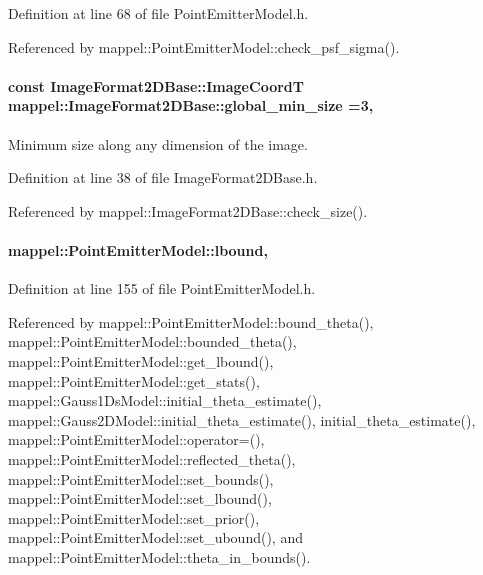 Definition at line 68 of file Point\+Emitter\+Model.\+h.



Referenced by mappel\+::\+Point\+Emitter\+Model\+::check\+\_\+psf\+\_\+sigma().

\paragraph[{\texorpdfstring{global\+\_\+min\+\_\+size}{global_min_size}}]{\setlength{\rightskip}{0pt plus 5cm}const {\bf Image\+Format2\+D\+Base\+::\+Image\+CoordT} mappel\+::\+Image\+Format2\+D\+Base\+::global\+\_\+min\+\_\+size =3\hspace{0.3cm}{\ttfamily [static]}, {\ttfamily [inherited]}}\hypertarget{classmappel_1_1ImageFormat2DBase_a1149e8545d3cfaa40c2f3bc02e3223b2}{}\label{classmappel_1_1ImageFormat2DBase_a1149e8545d3cfaa40c2f3bc02e3223b2}
Minimum size along any dimension of the image. 

Definition at line 38 of file Image\+Format2\+D\+Base.\+h.



Referenced by mappel\+::\+Image\+Format2\+D\+Base\+::check\+\_\+size().

\paragraph[{\texorpdfstring{lbound}{lbound}}]{ mappel\+::\+Point\+Emitter\+Model\+::lbound\hspace{0.3cm}{\ttfamily [protected]}, {\ttfamily [inherited]}}\hypertarget{classmappel_1_1PointEmitterModel_a889bc82f74cfa654da121e5770296ab2}{}\label{classmappel_1_1PointEmitterModel_a889bc82f74cfa654da121e5770296ab2}


Definition at line 155 of file Point\+Emitter\+Model.\+h.



Referenced by mappel\+::\+Point\+Emitter\+Model\+::bound\+\_\+theta(), mappel\+::\+Point\+Emitter\+Model\+::bounded\+\_\+theta(), mappel\+::\+Point\+Emitter\+Model\+::get\+\_\+lbound(), mappel\+::\+Point\+Emitter\+Model\+::get\+\_\+stats(), mappel\+::\+Gauss1\+Ds\+Model\+::initial\+\_\+theta\+\_\+estimate(), mappel\+::\+Gauss2\+D\+Model\+::initial\+\_\+theta\+\_\+estimate(), initial\+\_\+theta\+\_\+estimate(), mappel\+::\+Point\+Emitter\+Model\+::operator=(), mappel\+::\+Point\+Emitter\+Model\+::reflected\+\_\+theta(), mappel\+::\+Point\+Emitter\+Model\+::set\+\_\+bounds(), mappel\+::\+Point\+Emitter\+Model\+::set\+\_\+lbound(), mappel\+::\+Point\+Emitter\+Model\+::set\+\_\+prior(), mappel\+::\+Point\+Emitter\+Model\+::set\+\_\+ubound(), and mappel\+::\+Point\+Emitter\+Model\+::theta\+\_\+in\+\_\+bounds().

